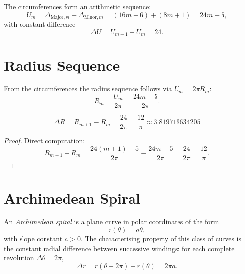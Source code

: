 \begin{theorem}
The circumferences form an arithmetic sequence:
\begin{equation}
  U_m = \Delta_{\mathrm{Major},m} + \Delta_{\mathrm{Minor},m}
      = (16m-6) + (8m+1)
      = 24m - 5,
\end{equation}
with constant difference
\[
  \Delta U = U_{m+1} - U_m = 24.
\]
\end{theorem}

\section{Radius Sequence}

From the circumferences the radius sequence follows via $U_m = 2\pi R_m$:
\begin{equation}
  R_m = \frac{U_m}{2\pi} = \frac{24m - 5}{2\pi}.
\end{equation}

\begin{theorem}
\begin{equation}
  \boxed{\Delta R = R_{m+1} - R_m = \frac{24}{2\pi} = \frac{12}{\pi}
  \approx 3.819718634205}
\end{equation}
\end{theorem}

\begin{proof}
Direct computation:
\[
  R_{m+1} - R_m
  = \frac{24(m+1)-5}{2\pi} - \frac{24m-5}{2\pi}
  = \frac{24}{2\pi}
  = \frac{12}{\pi}.
\]
\end{proof}

\section{Archimedean Spiral}

\begin{definition}
An \emph{Archimedean spiral} is a plane curve in polar coordinates
of the form
\[
  r(\theta) = a\theta,
\]
with slope constant $a > 0$. The characterising property of this
class of curves is the constant radial difference between successive
windings: for each complete revolution $\Delta\theta = 2\pi$,
\[
  \Delta r = r(\theta + 2\pi) - r(\theta) = 2\pi a.
\]
\end{definition}

